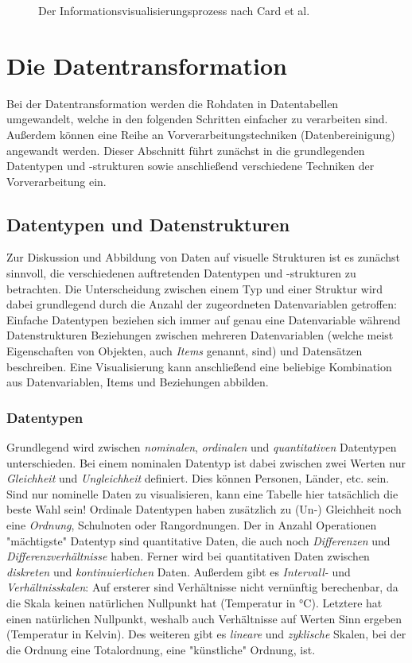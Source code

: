 \begin{figure}
	\centering
	\tikzInfoVis
	\caption[Informationsvisualisierungsprozess]{Der Informationsvisualisierungsprozess nach Card et al.}
	\label{fig:visualisierungsprozess}
\end{figure}

\section{Die Datentransformation}
	\label{sec:dataTransformation}

	Bei der Datentransformation werden die Rohdaten in Datentabellen umgewandelt, welche in den folgenden Schritten einfacher zu verarbeiten sind. Außerdem können eine Reihe an Vorverarbeitungstechniken (\bspw Datenbereinigung) angewandt werden. Dieser Abschnitt führt zunächst in die grundlegenden Datentypen und -strukturen sowie anschließend verschiedene Techniken der Vorverarbeitung ein.

	\subsection{Datentypen und Datenstrukturen}
		Zur Diskussion und Abbildung von Daten auf visuelle Strukturen ist es zunächst sinnvoll, die verschiedenen auftretenden Datentypen und -strukturen zu betrachten. Die Unterscheidung zwischen einem Typ und einer Struktur wird dabei grundlegend durch die Anzahl der zugeordneten Datenvariablen getroffen: Einfache Datentypen beziehen sich immer auf genau eine Datenvariable während Datenstrukturen Beziehungen zwischen mehreren Datenvariablen (welche meist Eigenschaften von Objekten, auch \emph{Items} genannt, sind) und Datensätzen beschreiben. Eine Visualisierung kann anschließend eine beliebige Kombination aus Datenvariablen, Items und Beziehungen abbilden.

		\subsubsection{Datentypen}
			Grundlegend wird zwischen \emph{nominalen}, \emph{ordinalen} und \emph{quantitativen} Datentypen unterschieden. Bei einem nominalen Datentyp ist dabei zwischen zwei Werten nur \emph{Gleichheit} und \emph{Ungleichheit} definiert. Dies können \zB Personen, Länder, etc. sein. Sind nur nominelle Daten zu visualisieren, kann eine Tabelle hier tatsächlich die beste Wahl sein! Ordinale Datentypen haben zusätzlich zu (Un-) Gleichheit noch eine \emph{Ordnung}, \bspw Schulnoten oder Rangordnungen. Der in Anzahl Operationen "mächtigste" Datentyp sind quantitative Daten, die auch noch \emph{Differenzen} und \emph{Differenzverhältnisse} haben. Ferner wird bei quantitativen Daten zwischen \emph{diskreten} und \emph{kontinuierlichen} Daten. Außerdem gibt es \emph{Intervall-} und \emph{Verhältnisskalen}: Auf ersterer sind Verhältnisse nicht vernünftig berechenbar, da die Skala keinen natürlichen Nullpunkt hat (\bspw Temperatur in \si{\degreeCelsius}). Letztere hat einen natürlichen Nullpunkt, weshalb auch Verhältnisse auf Werten Sinn ergeben (\bspw Temperatur in Kelvin). Des weiteren gibt es \emph{lineare} und \emph{zyklische} Skalen, bei der die Ordnung eine Totalordnung, \bzw eine "künstliche" Ordnung, ist.

